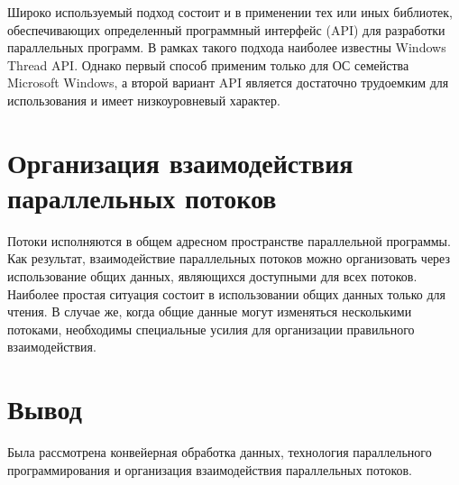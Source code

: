 Широко используемый подход состоит и в применении тех или иных библиотек, обеспечивающих определенный программный интерфейс ({\ttfamily API}) для разработки параллельных программ. В рамках такого подхода наиболее известны {\ttfamily Windows Thread API}. Однако первый способ применим только для ОС семейства {\ttfamily Microsoft Windows}, а второй вариант {\ttfamily API} является достаточно трудоемким для использования и имеет низкоуровневый характер.


\section{Организация взаимодействия параллельных потоков}

Потоки исполняются в общем адресном пространстве параллельной программы. Как результат, взаимодействие параллельных потоков можно организовать через использование общих данных, являющихся доступными для всех потоков. Наиболее простая ситуация состоит в использовании общих данных только для чтения. В случае же, когда общие данные могут изменяться несколькими потоками, необходимы специальные усилия для организации правильного взаимодействия.



\section*{Вывод}
Была рассмотрена конвейерная обработка данных, технология параллельного программирования и
организация взаимодействия параллельных потоков.

